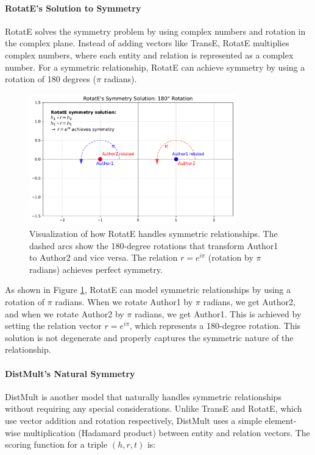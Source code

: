 \documentclass[10pt,a4paper]{article}
\begin{document}
\paragraph{RotatE's Solution to Symmetry}
RotatE solves the symmetry problem by using complex numbers and rotation in the complex plane. Instead of adding vectors like TransE, RotatE multiplies complex numbers, where each entity and relation is represented as a complex number. For a symmetric relationship, RotatE can achieve symmetry by using a rotation of 180 degrees ($\pi$ radians).

\begin{figure}[H]
    \centering
    \includegraphics[width=0.8\textwidth]{img/rotate_symmetry.pdf}
    \caption{Visualization of how RotatE handles symmetric relationships. The dashed arcs show the 180-degree rotations that transform Author1 to Author2 and vice versa. The relation $r = e^{i\pi}$ (rotation by $\pi$ radians) achieves perfect symmetry.}
    \label{fig:rotate_symmetry}
\end{figure}

As shown in Figure \ref{fig:rotate_symmetry}, RotatE can model symmetric relationships by using a rotation of $\pi$ radians. When we rotate Author1 by $\pi$ radians, we get Author2, and when we rotate Author2 by $\pi$ radians, we get Author1. This is achieved by setting the relation vector $r = e^{i\pi}$, which represents a 180-degree rotation. This solution is not degenerate and properly captures the symmetric nature of the relationship.

\paragraph{DistMult's Natural Symmetry}
DistMult is another model that naturally handles symmetric relationships without requiring any special considerations. Unlike TransE and RotatE, which use vector addition and rotation respectively, DistMult uses a simple element-wise multiplication (Hadamard product) between entity and relation vectors. The scoring function for a triple $(h, r, t)$ is:
\end{document}
